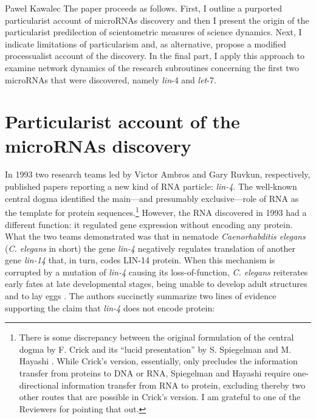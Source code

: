 \begin{artengenv}{Paweł Kawalec}
The paper proceeds as follows. First, I outline a purported particularist account of microRNAs discovery and then I present the origin of the particularist predilection of scientometric measures of science dynamics. Next, I indicate limitations of particularism and, as alternative, propose a modified processualist account of the discovery. In the final part, I apply this approach to examine network dynamics of the research subroutines concerning the first two microRNAs that were discovered, namely \textit{lin}-4 and \textit{let}-7.

\section{Particularist account of the microRNAs discovery}
In 1993 two research teams led by Victor Ambros and Gary Ruvkun, respectively, published papers reporting a new kind of RNA particle: \textit{lin-4}. The well-known central dogma identified the main---and presumably exclusive---role of RNA as the template for protein sequences.\footnote{There is some discrepancy between the original formulation of the central dogma by F. Crick
\parencite*[][]{crick_central_1970} %
 and its ``lucid presentation'' 
\parencite[][pp.297–298]{watson_molecular_1965} %
 by S. Spiegelman and M. Hayashi 
\parencite*[][]{spiegelman_present_1963}. %
 While Crick's version, essentially, only precludes the information transfer from proteins to DNA or RNA, Spiegelman and Hayashi require one-directional information transfer from RNA to protein, excluding thereby two other routes that are possible in Crick's version. I am grateful to one of the Reviewers for pointing that out.} However, the RNA discovered in 1993 had a different function: it regulated gene expression without encoding any protein. What the two teams demonstrated was that in nematode \textit{Caenorhabditis elegans} (\textit{C. elegans} in short) the gene \textit{lin-4} negatively regulates translation of another gene \textit{lin-14} that, in turn, codes LIN-14 protein. When this mechanism is corrupted by a mutation of \textit{lin-4} causing its loss-of-function, \textit{C. elegans} reiterates early fates at late developmental stages, being unable to develop adult structures and to lay eggs 
\parencite[][]{lee_c_1993}. %
 The authors succinctly summarize two lines of evidence supporting the claim that \textit{lin-4} does not encode protein:


\end{artengenv}
